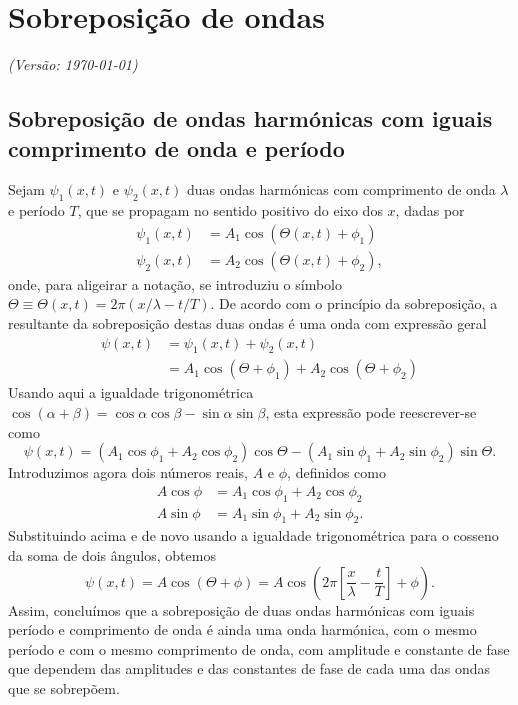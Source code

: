 \chapter{Sobreposição de ondas}
\label{chpt:superp}
\textsl{{\sffamily(Versão: \today)}}

\section{Sobreposição de ondas harmónicas com iguais comprimento de onda e
período}
\label{sec:sobrpos}
Sejam $\psi_1(x,t)$ e $\psi_2(x,t)$ duas ondas harmónicas com comprimento de
onda $\lambda$ e período $T$, que se propagam no sentido positivo do eixo dos
$x$, dadas por
\begin{align*}
\psi_1(x,t)&=A_1\cos\left(\Theta(x,t)+\phi_1\right)\\
\psi_2(x,t)&=A_2\cos\left(\Theta(x,t)+\phi_2\right),
\end{align*}
onde, para aligeirar a notação, se introduziu o símbolo
$\Theta\equiv\Theta(x,t)=2\pi(x/\lambda-t/T)$. De acordo com o princípio da
sobreposição, a resultante da sobreposição destas duas ondas é uma onda com
expressão geral
\begin{align*}
\psi(x,t)&=\psi_1(x,t)+\psi_2(x,t)\\
&=A_1\cos(\Theta+\phi_1)+A_2\cos(\Theta+\phi_2)
\end{align*}
Usando aqui a igualdade trigonométrica
$\cos(\alpha+\beta)=\cos\alpha\cos\beta-\sin\alpha\sin\beta$, esta expressão
pode reescrever-se como
\begin{equation*}
\psi(x,t)=(A_1\cos\phi_1+A_2\cos\phi_2)\cos\Theta-
(A_1\sin\phi_1+A_2\sin\phi_2)\sin\Theta.
\end{equation*}
Introduzimos agora dois números reais, $A$ e $\phi$, definidos como
\begin{align*}
A\cos\phi&=A_1\cos\phi_1+A_2\cos\phi_2\\
A\sin\phi&=A_1\sin\phi_1+A_2\sin\phi_2.
\end{align*}
Substituindo acima e de novo usando a igualdade trigonométrica para o cosseno da
soma de dois ângulos, obtemos
\begin{equation*}
\psi(x,t)=A\cos\left(\Theta+\phi\right)=
A\cos\left(2\pi\left[\frac{x}{\lambda}-\frac{t}{T}\right]+\phi\right).
\end{equation*}
Assim, concluímos que a sobreposição de duas ondas harmónicas com iguais período
e comprimento de onda é ainda uma onda harmónica, com o mesmo período e com o
mesmo comprimento de onda, com amplitude e constante de fase que dependem das amplitudes
e das constantes de fase de cada uma das ondas que se sobrepõem.

